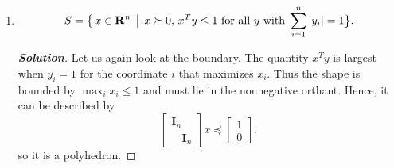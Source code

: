 \documentclass[12pt]{article}
\newenvironment{Solution}
  {\begin{proof}[\textbf{Solution}]}
  {\end{proof}}
\begin{document}
\begin{enumerate}[label=(\alph*)]
	      \begin{Solution}
		      The term \(x^T y\) is the dot product with a unit vector. Since \(x\) is chosen arbitrarily, we can set
		      \(\displaystyle y = \frac{x}{\|x\|_2}\)
		      to examine the boundary of the set, which gives
		      \[
			      \|x\|_2 \,\leq\, 1.
		      \]
		      Along with \(x \succeq 0\), this describes a portion of the \(n\)-dimensional sphere lying in the nonnegative orthant. Hence, it is not a polyhedron.
	      \end{Solution}

	\item
	      \[
		      S
		      =
		      \bigl\{\,
		      x \in \mathbf{R}^n
		      \,\bigm|\,
		      x \succeq 0,\,
		      x^T y \leq 1
		      \text{ for all }y\text{ with }
		      \sum_{i=1}^n |y_i| = 1
		      \bigr\}.
	      \]

	      \begin{Solution}
		      Let us again look at the boundary. The quantity \(x^T y\) is largest when \(y_i = 1\) for the coordinate \(i\) that maximizes \(x_i\). Thus the shape is bounded by
		      \(\max_i x_i \leq 1\)
		      and must lie in the nonnegative orthant.
		      Hence, it can be described by
		      \[
			      \begin{bmatrix}
				      \mathbf{I}_n \\
				      -\,\mathbf{I}_n
			      \end{bmatrix}
			      x
			      \preceq
			      \begin{bmatrix}
				      1 \\[3pt]
				      0
			      \end{bmatrix},
		      \]
		      so it is a polyhedron.
	      \end{Solution}

\end{enumerate}
\end{document}
